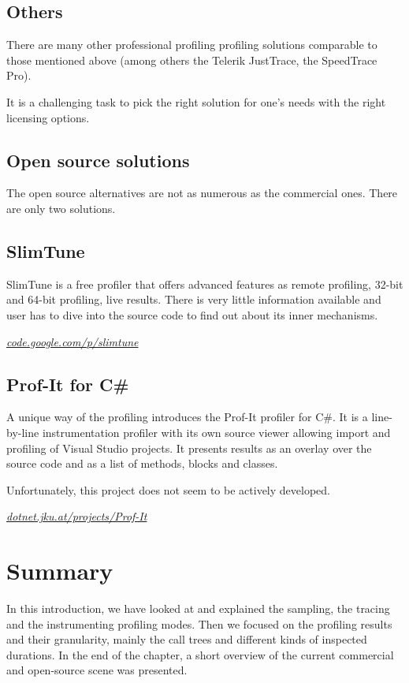 \subsection{Others}
There are many other professional profiling profiling solutions comparable to those mentioned above (among others the Telerik JustTrace, the SpeedTrace Pro).

It is a challenging task to pick the right solution for one's needs with the right licensing options.

\subsection*{Open source solutions}
The open source alternatives are not as numerous as the commercial ones. There are only two solutions.

\subsection{SlimTune}
SlimTune is a free profiler that offers advanced features as remote profiling, 32-bit and 64-bit profiling, live results. There is very little information available and user has to dive into the source code to find out about its inner mechanisms.

\textit{\href{http://code.google.com/p/slimtune}{code.google.com/p/slimtune}}

\subsection{Prof-It for C\#}
A unique way of the profiling introduces the Prof-It profiler for C\#. It is a line-by-line instrumentation profiler with its own source viewer allowing import and profiling of Visual Studio projects. It presents results as an overlay over the source code and as a list of methods, blocks and classes. 

Unfortunately, this project does not seem to be actively developed. 

\textit{\href{http://dotnet.jku.at/projects/Prof-It/}{dotnet.jku.at/projects/Prof-It}}

\section*{Summary}
In this introduction, we have looked at and explained the sampling, the tracing and the instrumenting profiling modes. Then we focused on the profiling results and their granularity, mainly the call trees and different kinds of inspected durations. In the end of the chapter, a short overview of the current commercial and open-source scene was presented.

 

